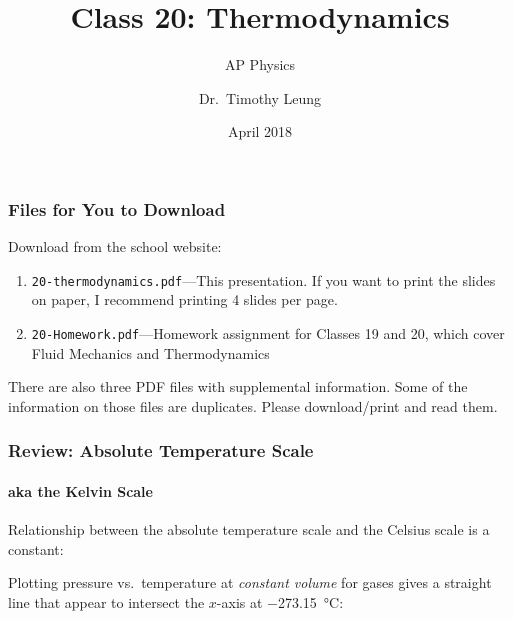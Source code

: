 \documentclass[12pt,aspectratio=169]{beamer}
\title{Class 20: Thermodynamics}
\subtitle{AP Physics}
\author[TML]{Dr.\ Timothy Leung}
\institute{Olympiads School}
\date{April 2018}
\newcommand{\eq}[2]{\vspace{#1}{\Large\begin{displaymath}#2\end{displaymath}}}
\begin{document}
\begin{frame}
  \maketitle
\end{frame}



\begin{frame}
  \frametitle{Files for You to Download}
  Download from the school website:
  \begin{enumerate}
  \item\texttt{20-thermodynamics.pdf}---This presentation. If you want to print
    the slides on paper, I recommend printing 4 slides per page.
  \item\texttt{20-Homework.pdf}---Homework assignment for Classes 19 and 20,
    which cover Fluid Mechanics and Thermodynamics
  \end{enumerate}

  \vspace{.2in}There are also three PDF files with supplemental information.
  Some of the information on those files are duplicates. Please download/print
  and read them.
\end{frame}



\begin{frame}
  \frametitle{Review: Absolute Temperature Scale}
  \framesubtitle{aka the Kelvin Scale}
  Relationship between the absolute temperature scale and the Celsius scale is
  a constant:
  
  \eq{-.4in}{
    \boxed{T = T_C + 273.15}
  }
  
  \vspace{-.1in}Plotting pressure vs.\ temperature at \emph{constant volume}
  for gases gives a straight line that appear to intersect the $x$-axis at
  \SI{-273.15}{\celsius}:
  \begin{center}
  \end{center}
\end{frame}
\end{document}
